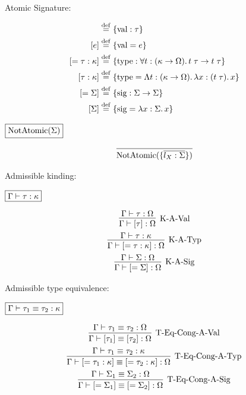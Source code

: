 Atomic Signature:

\begin{align*}
  [\tau] &\defrel{=} \{\symval: \tau\} \\
  [e] &\defrel{=} \{\symval = e\} \\
  [= \tau: \kappa] &\defrel{=} \{\symtype: \forall t: (\kappa \to \Omega)\ldotp t\; \tau \to t\; \tau\} \\
  [\tau: \kappa] &\defrel{=} \{\symtype = \Lambda t: (\kappa \to \Omega)\ldotp \lambda x: (t\; \tau)\ldotp x\} \\
  [= \Sigma] &\defrel{=} \{\symsig: \Sigma \to \Sigma\} \\
  [\Sigma] &\defrel{=} \{\symsig = \lambda x: \Sigma\ldotp x\}
\end{align*}

$\fbox{$\mathop{\mathrm{NotAtomic}}(\Sigma)$}$

\begin{gather*}
  \infer{\symNotAtomic(\{\overline{l_X: \Sigma}\})}{}
\end{gather*}

Admissible kinding:

$\fbox{$\Gamma \vdash \tau: \kappa$}$

\begin{gather*}
  \infer[\text{K-A-Val}]{\Gamma \vdash [\tau]: \Omega}{
    \Gamma \vdash \tau: \Omega
  }
  \\
  \infer[\text{K-A-Typ}]{\Gamma \vdash [= \tau: \kappa]: \Omega}{
    \Gamma \vdash \tau: \kappa
  }
  \\
  \infer[\text{K-A-Sig}]{\Gamma \vdash [= \Sigma]: \Omega}{
    \Gamma \vdash \Sigma: \Omega
  }
\end{gather*}

Admissible type equivalence:

$\fbox{$\Gamma \vdash \tau_1 \equiv \tau_2: \kappa$}$

\begin{gather*}
  \infer[\text{T-Eq-Cong-A-Val}]{\Gamma \vdash [\tau_1] \equiv [\tau_2]: \Omega}{
    \Gamma \vdash \tau_1 \equiv \tau_2: \Omega
  }
  \\
  \infer[\text{T-Eq-Cong-A-Typ}]{\Gamma \vdash [= \tau_1: \kappa] \equiv [= \tau_2: \kappa]: \Omega}{
    \Gamma \vdash \tau_1 \equiv \tau_2: \kappa
  }
  \\
  \infer[\text{T-Eq-Cong-A-Sig}]{\Gamma \vdash [= \Sigma_1] \equiv [= \Sigma_2]: \Omega}{
    \Gamma \vdash \Sigma_1 \equiv \Sigma_2: \Omega
  }
\end{gather*}

